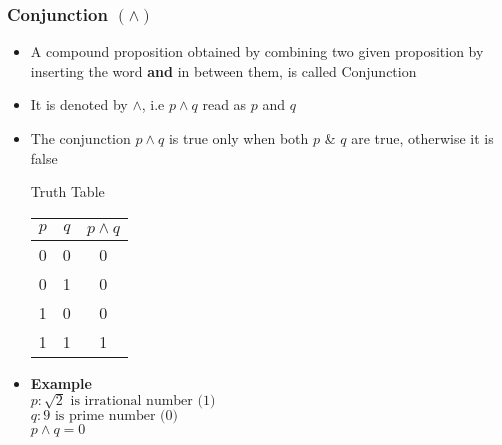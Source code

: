\documentclass{article}
\begin{document}
	\subsubsection{Conjunction $(\land)$}
	\begin{itemize}
		\item A compound proposition obtained by combining two given proposition by inserting the word
			\textbf{and} in between them, is called Conjunction
		\item It is denoted by $\land$, i.e $p\land q$ read as $p$ and $q$
		\item The conjunction $p\land q$ is true only when both $p$ \& $q$ are true, otherwise it is
			false
			\begin{center}
				Truth Table \\ \vspace{1em}
				\begin{tabular}{|c|c|c|} \hline
					$p$ &  $q$ & $p\land q$ \\ \hline
					0 & 0 & 0 \\
					0 & 1 & 0 \\
					1 & 0 & 0 \\
					1 & 1 & 1 \\ \hline
				\end{tabular}
			\end{center}
		\item [] \textbf{Example} \\
			$p : \sqrt{2}\text{ is irrational number (1)}$ \\
			$q : 9\text{ is prime number (0)}$ \\
			$p\land q=0$
	\end{itemize}
\end{document}

